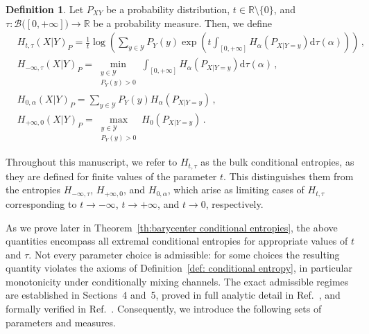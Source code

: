 \documentclass[aps,pra,11pt,onecolumn,nofootinbib,tightenlines]{revtex4-2}
\theoremstyle{definition}
\newtheorem{definition}[theorem]{Definition}
\def \d {\mathrm{d}}
\newcommand{\Y}{\mathcal{Y}}
\newcommand{\R}{\mathbb{R}}
\newcommand{\mc}[1]{\mathcal{#1}}
\newcommand{\mb}[1]{\mathbb{#1}}
\begin{document}
\begin{definition}
\label{def: extremal entropies}
Let $P_{XY}$ be a probability distribution, $t\in\R\setminus\{0\}$, and $\tau:\mc B\big([0,+\infty]\big)\to\mb R$ be a probability measure. Then, we define
\begin{align}
    &H_{t,\tau}(X|Y)_P = \frac{1}{t}\log \left(\sum_{y \in \Y} P_Y(y)\exp{\left(t\int_{[0,+\infty]}H_\alpha(P_{X|Y=y})\d\tau(\alpha)\right)}\right) \,, \label{eq:TempEnt}\\
    & H_{-\infty,\tau}(X|Y)_P =  \min \limits_{\substack{y \in \mathcal{Y} \\ P_Y( y) > 0}}\int_{[0,+\infty]}H_\alpha(P_{X|Y=y})\d\tau(\alpha) \,, \label{eq:TropEnt}\\
    & H_{0,\alpha}(X|Y)_P =  \sum_{y \in \Y} P_Y(y)H_\alpha(P_{X|Y=y})\,,\label{eq:DerivEnt} \\
    & H_{+\infty,0}(X|Y)_P =  \max \limits_{\substack{y \in \mathcal{Y} \\ P_Y( y) > 0}} H_0(P_{X|Y=y}) \,. \label{eq:TropEntno}
\end{align}
\end{definition}
Throughout this manuscript, we refer to \(H_{t,\tau}\) as the bulk conditional entropies, as they are defined for finite values of the parameter \(t\). This distinguishes them from the entropies \(H_{-\infty,\tau}\), \(H_{+\infty,0}\), and \(H_{0,\alpha}\), which arise as limiting cases of $H_{t,\tau}$ corresponding to \(t \to -\infty\), \(t \to +\infty\), and \(t \to 0\), respectively.



As we prove later in Theorem~\ref{th:barycenter conditional entropies}, the above quantities encompass all extremal conditional entropies for appropriate values of $t$ and $\tau$. Not every parameter choice is admissible: for some choices the resulting quantity violates the axioms of Definition~\ref{def: conditional entropy}, in particular monotonicity under conditionally mixing channels. The exact admissible regimes are established in Sections~4 and~5, proved in full analytic detail in Ref.~\cite{rubboli2026parametersFull}, and formally verified in Ref.~\cite{rubboli2026parametersLean}. Consequently, we introduce the following sets of parameters and measures.
\end{document}
